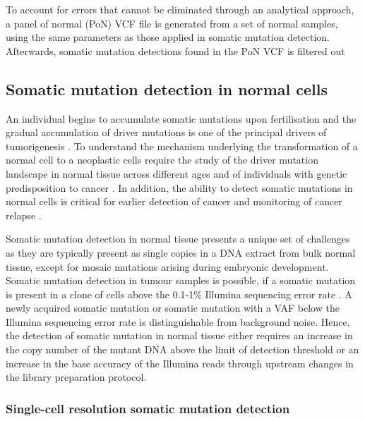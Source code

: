 To account for errors that cannot be eliminated through an analytical approach, a panel of normal (PoN) VCF file is generated from a set of normal samples, using the same parameters as those applied in somatic mutation detection. Afterwards, somatic mutation detections found in the PoN VCF is filtered out \cite{Cibulskis2013-gw}


\subsection{Somatic mutation detection in normal cells}

An individual begins to accumulate somatic mutations upon fertilisation and the gradual accumulation of driver mutations is one of the principal drivers of tumorigenesis \cite{Stratton2009-of}. To understand the mechanism underlying the transformation of a normal cell to a neoplastic cells require the study of the driver mutation landscape in normal tissue across different ages and of individuals with genetic predisposition to cancer \cite{Martincorena2015-io}. In addition, the ability to detect somatic mutations in normal cells is critical for earlier detection of cancer and monitoring of cancer relapse \cite{Newman2014-qq, Newman2016-cy}.

Somatic mutation detection in normal tissue presents a unique set of challenges as they are typically present as single copies in a DNA extract from bulk normal tissue, except for mosaic mutations arising during embryonic development. Somatic mutation detection in tumour samples is possible, if a somatic mutation is present in a clone of cells above the 0.1-1\% Illumina sequencing error rate \cite{Cibulskis2013-gw}. A newly acquired somatic mutation or somatic mutation with a VAF below the Illumina sequencing error rate is distinguishable from background noise. Hence, the detection of somatic mutation in normal tissue either requires an increase in the copy number of the mutant DNA above the limit of detection threshold or an increase in the base accuracy of the Illumina reads through upstream changes in the library preparation protocol. 

\subsubsection{Single-cell resolution somatic mutation detection}

